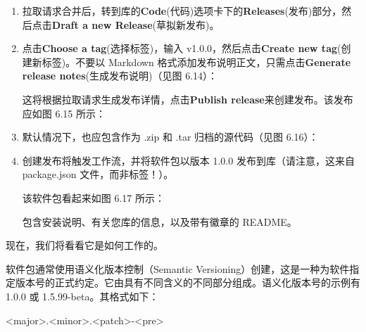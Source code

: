 \begin{enumerate}
\item 
拉取请求合并后，转到库的\textbf{Code}(代码)选项卡下的\textbf{Releases}(发布)部分，然后点击\textbf{Draft a new Release}(草拟新发布)。

\item 
点击\textbf{Choose a tag}(选择标签)，输入 v1.0.0，然后点击\textbf{Create new tag}(创建新标签)。不要以 Markdown 格式添加发布说明正文，只需点击\textbf{Generate release notes}(生成发布说明)（见图 6.14）：


这将根据拉取请求生成发布详情，点击\textbf{Publish release}来创建发布。该发布应如图 6.15 所示：


\item 
默认情况下，也应包含作为 .zip 和 .tar 归档的源代码（见图 6.16）：


\item 
创建发布将触发工作流，并将软件包以版本 1.0.0 发布到库（请注意，这来自 package.json 文件，而非标签！）。

该软件包看起来如图 6.17 所示：


包含安装说明、有关您库的信息，以及带有徽章的 README。

\end{enumerate}


现在，我们将看看它是如何工作的。


软件包通常使用语义化版本控制（Semantic Versioning）创建，这是一种为软件指定版本号的正式约定。它由具有不同含义的不同部分组成。语义化版本号的示例有 1.0.0 或 1.5.99-beta。其格式如下：

\begin{shell}
<major>.<minor>.<patch>-<pre>
\end{shell}

